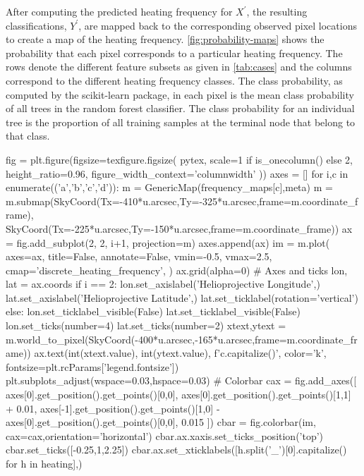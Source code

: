 After computing the predicted heating frequency for $X^\prime$, the resulting classifications, $Y^\prime$, are mapped back to the corresponding observed pixel locations to create a map of the heating frequency.
\autoref{fig:probability-maps} shows the probability that each pixel corresponds to a particular heating frequency.
The rows denote the different feature subsets as given in \autoref{tab:cases} and the columns correspond to the different heating frequency classes.
The class probability, as computed by the scikit-learn package, in each pixel is the mean class probability of all trees in the random forest classifier.
The class probability for an individual tree is the proportion of all training samples at the terminal node that belong to that class.

\begin{pycode}[manager_ml]
fig = plt.figure(figsize=texfigure.figsize(
    pytex,
    scale=1 if is_onecolumn() else 2,
    height_ratio=0.96,
    figure_width_context='columnwidth'
))
axes = []
for i,c in enumerate(('a','b','c','d')):
    m = GenericMap(frequency_maps[c],meta)
    m = m.submap(SkyCoord(Tx=-410*u.arcsec,Ty=-325*u.arcsec,frame=m.coordinate_frame),
                 SkyCoord(Tx=-225*u.arcsec,Ty=-150*u.arcsec,frame=m.coordinate_frame))
    ax = fig.add_subplot(2, 2, i+1, projection=m)
    axes.append(ax)
    im = m.plot(
        axes=ax,
        title=False,
        annotate=False,
        vmin=-0.5,
        vmax=2.5,
        cmap='discrete_heating_frequency',
    )
    ax.grid(alpha=0)
    # Axes and ticks
    lon, lat = ax.coords
    if i == 2:
        lon.set_axislabel('Helioprojective Longitude',)
        lat.set_axislabel('Helioprojective Latitude',)
        lat.set_ticklabel(rotation='vertical')
    else:
        lon.set_ticklabel_visible(False)
        lat.set_ticklabel_visible(False)
    lon.set_ticks(number=4)
    lat.set_ticks(number=2)
    xtext,ytext = m.world_to_pixel(SkyCoord(-400*u.arcsec,-165*u.arcsec,frame=m.coordinate_frame))
    ax.text(int(xtext.value), int(ytext.value), f'{c.capitalize()}', color='k', fontsize=plt.rcParams['legend.fontsize'])
plt.subplots_adjust(wspace=0.03,hspace=0.03)
# Colorbar
cax = fig.add_axes([
    axes[0].get_position().get_points()[0,0],
    axes[0].get_position().get_points()[1,1] + 0.01,
    axes[-1].get_position().get_points()[1,0] - axes[0].get_position().get_points()[0,0],
    0.015
])
cbar = fig.colorbar(im, cax=cax,orientation='horizontal')
cbar.ax.xaxis.set_ticks_position('top')
cbar.set_ticks([-0.25,1,2.25])
cbar.ax.set_xticklabels([h.split('_')[0].capitalize() for h in heating],)

\end{pycode}

